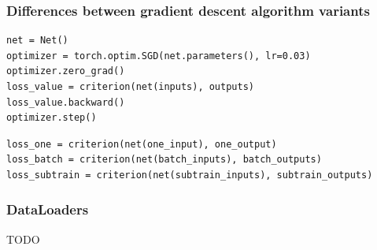 \documentclass{beamer}
\begin{document}
\begin{frame}[fragile]
  \frametitle{Differences between gradient descent algorithm variants}

\begin{verbatim}
net = Net()
optimizer = torch.optim.SGD(net.parameters(), lr=0.03)
optimizer.zero_grad()
loss_value = criterion(net(inputs), outputs)
loss_value.backward()
optimizer.step()
\end{verbatim}

\begin{verbatim}
loss_one = criterion(net(one_input), one_output)
loss_batch = criterion(net(batch_inputs), batch_outputs)
loss_subtrain = criterion(net(subtrain_inputs), subtrain_outputs)
\end{verbatim}

\end{frame}

\begin{frame}
  \frametitle{DataLoaders}
  TODO
\end{frame}
\end{document}
